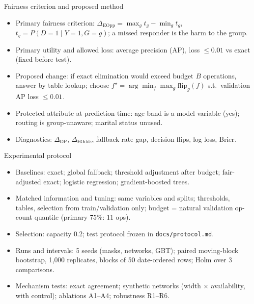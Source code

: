 \documentclass[aspectratio=169,11pt]{beamer}
\begin{document}
\begin{frame}{Fairness criterion and proposed method}
\begin{itemize}
\item Primary fairness criterion: $\Delta_{\mathrm{EOpp}}=\max_g t_g-\min_g t_g$, $t_g=P(D{=}1\mid Y{=}1,G{=}g)$; a missed responder is the harm to the group.
\item Primary utility and allowed loss: average precision (AP), loss $\le0.01$ vs exact (fixed before test).
\item Proposed change: if exact elimination would exceed budget $B$ operations, answer by table lookup; choose $f^\star=\arg\min_f\max_g\mathrm{flip}_g(f)$ s.t.\ validation AP loss $\le0.01$.
\item Protected attribute at prediction time: age band is a model variable (yes); routing is group-unaware; marital status unused.
\item Diagnostics: $\Delta_{\mathrm{DP}}$, $\Delta_{\mathrm{EOdds}}$, fallback-rate gap, decision flips, log loss, Brier.
\end{itemize}
\end{frame}

\begin{frame}{Experimental protocol}
\begin{itemize}
\item Baselines: exact; global fallback; threshold adjustment after budget; fair-adjusted exact; logistic regression; gradient-boosted trees.
\item Matched information and tuning: same variables and splits; thresholds, tables, selection from train/validation only; budget = natural validation op-count quantile (primary 75\%: 11 ops).
\item Selection: capacity 0.2; test protocol frozen in \texttt{docs/protocol.md}.
\item Runs and intervals: 5 seeds (masks, networks, GBT); paired moving-block bootstrap, 1,000 replicates, blocks of 50 date-ordered rows; Holm over 3 comparisons.
\item Mechanism tests: exact agreement; synthetic networks (width $\times$ availability, with control); ablations A1--A4; robustness R1--R6.
\end{itemize}
\end{frame}
\end{document}
